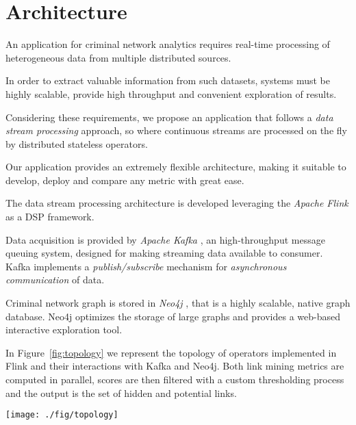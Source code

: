 \section{Architecture}
\label{sec:architecture}

An application for criminal network analytics requires real-time processing of heterogeneous data from multiple distributed sources.

In order to extract valuable information from such datasets, systems must be highly scalable, provide high throughput and convenient exploration of results.

Considering these requirements, we propose an application that follows a \textit{data stream processing} approach, so where continuous streams are processed on the fly by distributed stateless operators.

Our application provides an extremely flexible architecture, making it suitable to develop, deploy and compare any metric with great ease.

The data stream processing architecture is developed leveraging the \textit{Apache Flink} \cite{flink} as a DSP framework. 

Data acquisition is provided by \textit{Apache Kafka} \cite{kafka}, an high-throughput message queuing system, designed for making streaming data available to consumer. Kafka implements a \textit{publish/subscribe} mechanism for \textit{asynchronous communication} of data.

Criminal network graph is stored in \textit{Neo4j} \cite{neo4j}, that is a highly scalable, native graph database. Neo4j optimizes the storage of large graphs and provides a web-based interactive exploration tool.

In Figure~\ref{fig:topology} we represent the topology of operators implemented in Flink and their interactions with Kafka and Neo4j. Both link mining metrics are computed in parallel, scores are then filtered with a custom thresholding process and the output is the set of hidden and potential links.

\begin{figure*}
\centering
\texttt{[image: ./fig/topology]}
\caption{The topology of architecture.}
\label{fig:topology}
\end{figure*}


